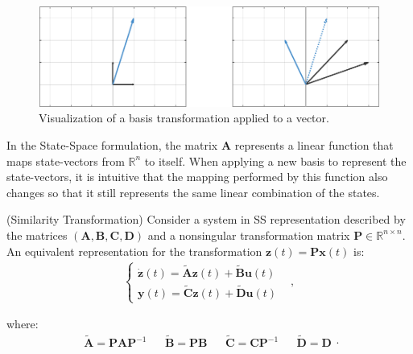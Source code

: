 \documentclass[a4paper,11pt]{book}
\numberwithin{figure}{chapter}
\numberwithin{equation}{chapter}
\numberwithin{table}{chapter}
\newtheorem{theorem}{Theorem}[chapter]
\theoremstyle{definition}
\newcounter{boxed-theorem}
\newenvironment{boxed-theorem}[1]
{\begin{shaded} \begin{theorem}{#1}}
{\end{theorem} \end{shaded}}
\newcounter{boxed-definition}
\begin{document}
\begin{figure}[ht]
    \centering
    \includegraphics[width=\textwidth]{chapter2/similarity01}
    \caption{Visualization of a basis transformation applied to a vector.}
    \label{fig:similarity01}
\end{figure}

In the State-Space formulation, the matrix $\bm{A}$ represents a linear function that maps state-vectors from $\mathbb{R}^{n}$ to itself. When applying a new basis to represent the state-vectors, it is intuitive that the mapping performed by this function also changes so that it still represents the same linear combination of the states.

\begin{boxed-theorem}{(Similarity Transformation)}
    Consider a system in SS representation described by the matrices $(\bm{A}, \bm{B}, \bm{C}, \bm{D})$ and a nonsingular transformation matrix $\bm{P} \in \mathbb{R}^{n \times n}$. An equivalent representation for the transformation $\bm{z}(t) = \bm{P} \bm{x}(t)$ is:
    \begin{align}
    \begin{cases}
        \dot{\bm{z}}(t) = \tilde{\bm{A}} \bm{z}(t) + \tilde{\bm{B}} \bm{u}(t) & \\
        \bm{y}(t) = \tilde{\bm{C}} \bm{z}(t) + \tilde{\bm{D}} \bm{u}(t)
    \end{cases} 
    ,\end{align}
    
    \noindent where:
    \begin{equation}
        \begin{matrix}
            \tilde{\bm{A}} = \bm{P} \bm{A} \bm{P}^{-1} & & \tilde{\bm{B}} = \bm{P} \bm{B} & & \tilde{\bm{C}} = \bm{C} \bm{P}^{-1} & & \tilde{\bm{D}} = \bm{D}
        \end{matrix}
    .\end{equation}
\end{boxed-theorem}
\end{document}
